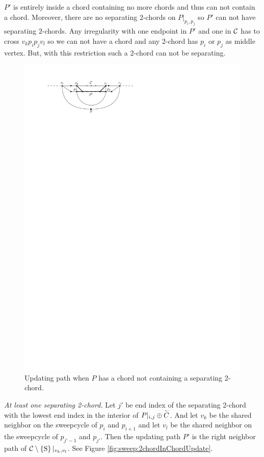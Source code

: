       $P'$ is entirely inside a chord containing no more chords and thus can not contain a chord. Moreover, there are no separating $2$-chords on $P|_{p_i, p_j}$ so $P'$ can not have separating $2$-chords. Any irregularity with one endpoint in $P'$ and one in $\mathcal{C}$ has to cross $v_k p_i p_j v_l$ so we can not have a chord and any 2-chord has $p_i$ or $p_j$ as middle vertex. But, with this restriction such a 2-chord can not be separating.

      \begin{figure}[h]
        \centering
        \includegraphics[scale=1]{unifiedAlgo/img/sweep/cases/chordUpdate}
        \caption{Updating path when $P$ has a chord not containing a separating 2-chord.}
        \label{fig:sweep:chordUpdate}
      \end{figure}

    \emph{At least one separating 2-chord.}
      Let $j'$ be end index of the separating 2-chord with the lowest end index in the interior of $P|_{i, j} \oplus \accentset{\leftharpoonup}{{C}}$. And let $v_k$ be the shared neighbor on the sweepcycle of $p_{i}$ and $p_{i +1}$ and let $v_l$ be the shared neighbor on the sweepcycle  of $p_{j' -1}$ and $p_{j'}$.
      Then the updating path $P'$ is the right neighbor path of $\mathcal{C} \setminus \left\lbrace {\mathrm{S}} \right\rbrace|_{v_k, v_l}$. See Figure \ref{fig:sweep:2chordInChordUpdate}.

